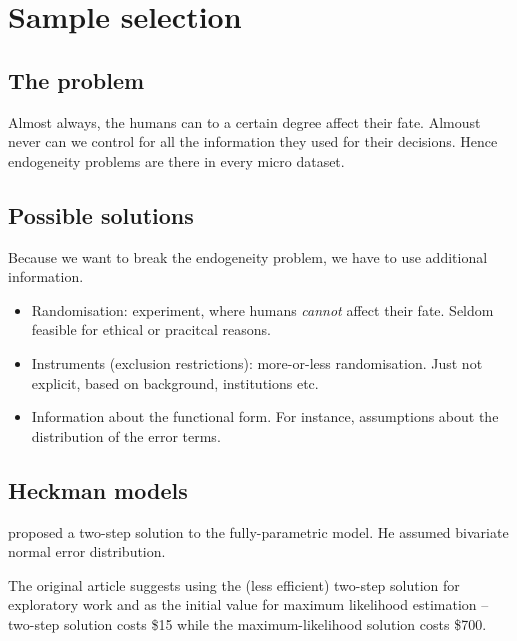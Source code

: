 \section{Sample selection}


\subsection{The problem}

Almost always, the humans can to a certain degree affect their fate.
Almoust never can we control for all the information they used for
their decisions.  Hence endogeneity problems are there in every micro
dataset.


\subsection{Possible solutions}

Because we want to break the endogeneity problem, we have to use
additional information.

\begin{itemize}
\item Randomisation: experiment, where humans \emph{cannot} affect
  their fate.  Seldom feasible for ethical or pracitcal reasons.
\item Instruments (exclusion restrictions): more-or-less
  randomisation.  Just not explicit, based on background, institutions
  etc.
\item Information about the functional form.  For instance,
  assumptions about the distribution of the error terms.
\end{itemize}


\subsection{Heckman models}

\citet{heckman76} proposed a two-step solution to the fully-parametric
model.  He assumed bivariate normal error distribution.

The original article suggests using the (less efficient) two-step
solution for exploratory work and as the initial value for maximum
likelihood estimation -- two-step solution costs \$15 while the
maximum-likelihood solution costs \$700.

